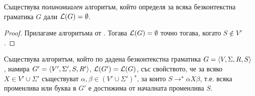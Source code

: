 \begin{framed}
  \begin{cor}
    Съществува {\em полиномиален} алгоритъм, който определя за всяка безконтекстна граматика $G$ дали $\mathcal{L}(G) = \emptyset$.
  \end{cor}  
\end{framed}
\begin{proof}
  Прилагаме алгоритъма от .
  Тогава $\mathcal{L}(G) = \emptyset$ точно тогава, когато $S \not\in V'$.  
\end{proof}

\begin{lemma}
  \label{lem:useless2}
  Съществува алгоритъм, който по дадена безконтекстна граматика $G = \langle{V,\Sigma,R,S}\rangle$, намира $G' = \langle{V',\Sigma',S,R'}\rangle$, $\mathcal{L}(G') = \mathcal{L}(G)$,
  със свойството, че за всяко $X \in V' \cup \Sigma'$ съществуват $\alpha, \beta \in (V'\cup\Sigma')^\star$,
  за които $S \to^\star \alpha X \beta$,
  т.е. всяка променлива или буква в $G'$ е достижима от началната променлива $S$.
\end{lemma}
